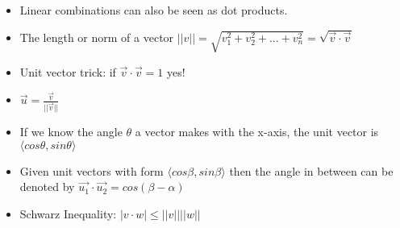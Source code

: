\begin{itemize}
    \item Linear combinations can also be seen as dot products.
    \item The length or norm of a vector $||v|| = \sqrt{v_1^2 + v_2^2 + ... + v_n^2} = \sqrt{\Vec{v} \cdot \Vec{v}}$
    \item Unit vector trick: if $\Vec{v} \cdot \Vec{v} = 1$ yes!
    \item $\Vec{u} = \frac{\Vec{v}}{||\vec{v}||}$
    \item If we know the angle $\theta$ a vector makes with the x-axis, the unit vector is $\langle cos\theta, sin\theta \rangle$
    \item Given unit vectors with form $\langle cos\beta, sin\beta \rangle$ then the angle in between can be denoted by $\vec{u_1}\cdot \vec{u_2}=cos(\beta - \alpha)$
    \item Schwarz Inequality: $|v\cdot w| \le ||v||||w||$
\end{itemize}

